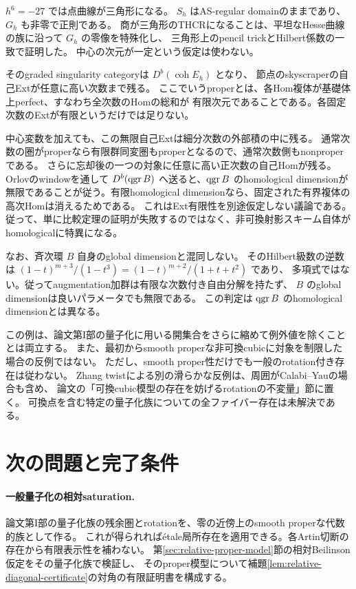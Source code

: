 \(h^6=-27\) では点曲線が三角形になる。
\(S_h\) はAS-regular domainのままであり、\(G_h\) も非零で正則である。
商が三角形のTHCRになることは、平坦なHesse曲線の族に沿って \(G_h\) の零像を特殊化し、
三角形上のpencil trickとHilbert係数の一致で証明した。
中心の次元が一定という仮定は使わない。

そのgraded singularity categoryは \(D^b(\operatorname{coh}E_h)\) となり、
節点のskyscraperの自己Extが任意に高い次数まで残る。
ここでいうproperとは、各Hom複体が基礎体上perfect、すなわち全次数のHomの総和が
有限次元であることである。各固定次数のExtが有限というだけでは足りない。

中心変数を加えても、この無限自己Extは細分次数の外部積の中に残る。
通常次数の圏がproperなら有限群同変圏もproperとなるので、通常次数側もnonproperである。
さらに忘却後の一つの対象に任意に高い正次数の自己Homが残る。
Orlovのwindowを通して \(D^b(\operatorname{qgr} B)\) へ送ると、\(\operatorname{qgr} B\) のhomological dimensionが
無限であることが従う。有限homological dimensionなら、固定された有界複体の高次Homは消えるためである。
これはExt有限性を別途仮定しない議論である。
従って、単に比較定理の証明が失敗するのではなく、非可換射影スキーム自体がhomologicalに特異になる。

なお、斉次環 \(B\) 自身のglobal dimensionと混同しない。
そのHilbert級数の逆数は \((1-t)^{m+3}/(1-t^3)=(1-t)^{m+2}/(1+t+t^2)\) であり、
多項式ではない。従ってaugmentation加群は有限な次数付き自由分解を持たず、
\(B\) のglobal dimensionは良いパラメータでも無限である。
この判定は \(\operatorname{qgr} B\) のhomological dimensionとは異なる。

この例は、論文第I部の量子化に用いる開集合をさらに縮めて例外値を除くこととは両立する。
また、最初からsmooth properな非可換cubicに対象を制限した場合の反例ではない。
ただし、smooth proper性だけでも一般のrotation付き存在は従わない。
Zhang twistによる別の滑らかな反例は、周囲がCalabi--Yauの場合も含め、
論文の「可換cubic模型の存在を妨げるrotationの不変量」節に置く。
可換点を含む特定の量子化族についての全ファイバー存在は未解決である。

\section{次の問題と完了条件}

\paragraph{一般量子化の相対saturation.}
論文第I部の量子化族の残余圏とrotationを、零の近傍上のsmooth properな代数的族として作る。
これが得られればétale局所存在を適用できる。各Artin切断の存在から有限表示性を補わない。
第\ref{sec:relative-proper-model}節の相対Beilinson仮定をその量子化族で検証し、
そのproper模型について補題\ref{lem:relative-diagonal-certificate}の対角の有限証明書を構成する。

